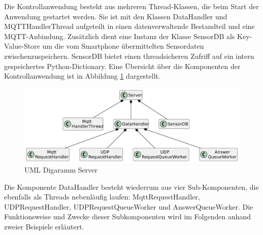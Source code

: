 \documentclass[11pt,a4paper]{report}
\begin{document}
Die Kontrollanwendung besteht aus mehreren Thread-Klassen, die beim Start der Anwendung gestartet werden.
Sie ist mit den Klassen DataHandler und MQTTHandlerThread aufgeteilt in einen datenverwaltende Bestandteil und eine MQTT-Anbindung.
Zusätzlich dient eine Instanz der Klasse SensorDB als Key-Value-Store um die vom Smartphone übermittelten Sensordaten zwischenzuspeichern.
SensorDB bietet einen threadsicheren Zufriff auf ein intern gespeichertes Python-Dictionary.
Eine Übersicht über die Komponenten der Kontrollanwendung ist in Abbildung \ref{fig:serverUml} dargestellt.
\begin{figure}[htbp]
  \centering
  \includegraphics[width=\textwidth]{images/ServerUml}
  \caption{UML Digaramm Server}
  \label{fig:serverUml}
\end{figure}
Die Komponente DataHandler besteht wiederrum aus vier Sub-Komponenten, die ebenfalls als Threads nebenläufig laufen: MqttRequestHandler, UDPRequestHandler, UDPRequestQueueWorker und AnswerQueueWorker.
Die Funktionsweise und Zwecke dieser Subkomponenten wird im Folgenden anhand zweier Beispiele erläutert.
\end{document}
